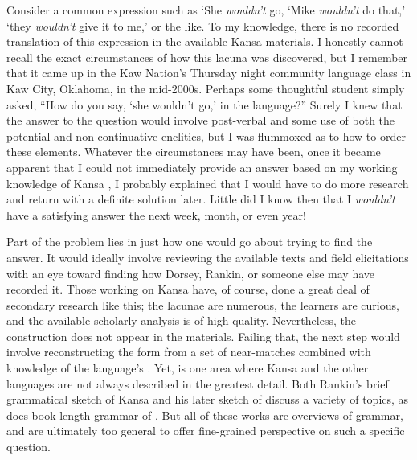 \documentclass[output=paper]{LSP/langsci}
\begin{document}
 
Consider a common  expression such as `She \textit{wouldn't} go, `Mike \textit{wouldn't} do that,' `they \textit{wouldn't} give it to me,' or the like. To my knowledge, there is no recorded translation of this expression in the available Kansa materials. I honestly cannot recall the exact circumstances of how this lacuna was discovered, but I remember that it came up in the Kaw Nation's Thursday night community language class in Kaw City, Oklahoma, in the mid-2000s. Perhaps some thoughtful student simply asked, ``How do you say, `she wouldn't go,' in the language?'' Surely I knew that the answer to the question would involve post-verbal  and some use of both the potential and non-continuative enclitics, but I was flummoxed as to how to order these elements. Whatever the circumstances may have been, once it became apparent that I could not immediately provide an answer based on my working knowledge of Kansa , I probably explained that I would have to do more research and return with a definite solution later. Little did I know then that I \textit{wouldn't} have a satisfying answer the next week, month, or even year!

Part of the problem lies in just how one would go about trying to find the answer. It would ideally involve reviewing the available texts and field elicitations with an eye toward finding how Dorsey, Rankin, or someone else may have recorded it. Those working on Kansa have, of course, done a great deal of secondary research like this; the lacunae are numerous, the learners are curious, and the available scholarly analysis is of high quality. Nevertheless, the construction does not appear in the materials. Failing that, the next step would involve reconstructing the form from a set of near-matches combined with knowledge of the language's . Yet,  is one area where Kansa and the other  languages are not always described in the greatest detail. Both Rankin's brief grammatical sketch of Kansa \citeyear{Rankin1989} and his later sketch of  \citeyear{Rankin2005b} discuss a variety of  topics, as does  book-length grammar of . But all of these works are overviews of  grammar, and are ultimately too general to offer fine-grained perspective on such a specific question. 
\end{document}
